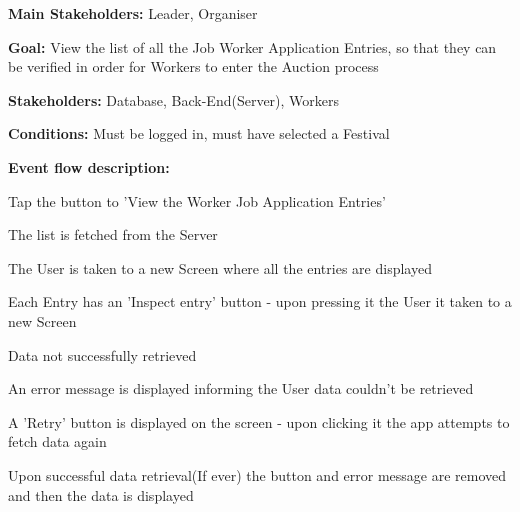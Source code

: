 			\noindent {}
			\begin{packed_item}
				\item \textbf{Main Stakeholders:} Leader, Organiser
				\item \textbf{Goal:} View the list of all the Job Worker Application Entries, so that they can be verified in order for Workers to enter the Auction process
				\item \textbf{Stakeholders: } Database, Back-End(Server), Workers
				\item \textbf{Conditions: } Must be logged in, must have selected a Festival
				\item \textbf{Event flow description: }
				\begin{packed_enum}
					\item Tap the button to 'View the Worker Job Application Entries'
					\item The list is fetched from the Server
					\item The User is taken to a new Screen where all the entries are displayed
					\item Each Entry has an 'Inspect entry' button - upon pressing it the User it taken to a new Screen
				\end{packed_enum}
				
				\begin{packed_item}
					\item[2.a] Data not successfully retrieved
					\item[] \begin{packed_enum}
						\item An error message is displayed informing the User data couldn't be retrieved
						\item A 'Retry' button is displayed on the screen - upon clicking it the app attempts to fetch data again
						\item Upon successful data retrieval(If ever) the button and error message are removed and then the data is displayed
					\end{packed_enum}
				\end{packed_item}
			\end{packed_item}
			
